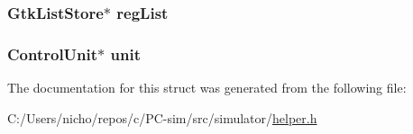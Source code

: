 \subsubsection[{\texorpdfstring{reg\+List}{regList}}]{\setlength{\rightskip}{0pt plus 5cm}Gtk\+List\+Store$\ast$ reg\+List}\hypertarget{struct_update_data_ab346f7795b5d9c7037de31b61c54f917}{}\label{struct_update_data_ab346f7795b5d9c7037de31b61c54f917}
\subsubsection[{\texorpdfstring{unit}{unit}}]{\setlength{\rightskip}{0pt plus 5cm}Control\+Unit$\ast$ unit}\hypertarget{struct_update_data_aef46f952d07fd9f4be393243758f7f81}{}\label{struct_update_data_aef46f952d07fd9f4be393243758f7f81}


The documentation for this struct was generated from the following file\+:\begin{DoxyCompactItemize}
\item 
C\+:/\+Users/nicho/repos/c/\+P\+C-\/sim/src/simulator/\hyperlink{helper_8h}{helper.\+h}\end{DoxyCompactItemize}

